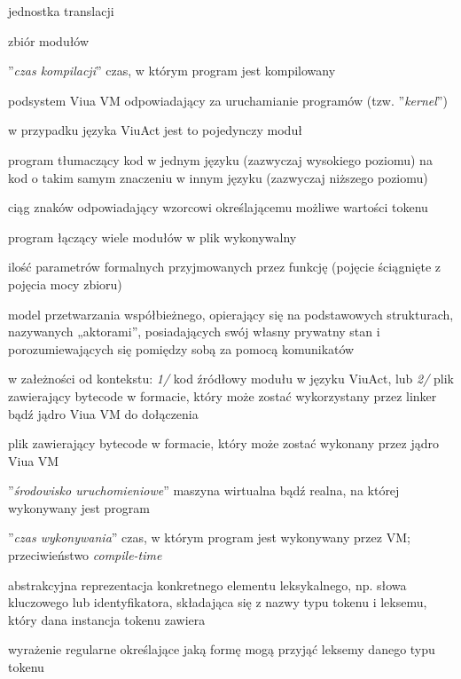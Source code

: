 \begin{labeling}{jednostka translacji}
    \item[biblioteka] zbiór modułów
    \item[\emph{compile-time}] ''\emph{czas kompilacji}'' czas, w którym program jest kompilowany
    \item[jądro] podsystem Viua VM odpowiadający za uruchamianie programów (tzw. ''\emph{kernel}'')
    \item[jednostka translacji] w przypadku języka ViuAct jest to pojedynczy moduł
    \item[kompilator] program tłumaczący kod w jednym języku (zazwyczaj wysokiego poziomu) na kod o takim
        samym znaczeniu w innym języku (zazwyczaj niższego poziomu)
    \item[leksem] ciąg znaków odpowiadający wzorcowi określającemu możliwe wartości tokenu
    \item[linker] program łączący wiele modułów w plik wykonywalny
    \item[moc funkcji] ilość parametrów formalnych przyjmowanych przez funkcję (pojęcie ściągnięte z pojęcia
        mocy zbioru)
    \item [model aktorów] model przetwarzania współbieżnego, opierający się na
        podstawowych strukturach, nazywanych „aktorami”, posiadających swój
        własny prywatny stan i porozumiewających się pomiędzy sobą za pomocą
        komunikatów
    \item[moduł] w załeżności od kontekstu: \emph{1/} kod źródłowy modułu w języku ViuAct, lub \emph{2/} plik
        zawierający bytecode w formacie, który może zostać wykorzystany przez linker bądź jądro Viua VM do
        dołączenia
    \item[plik wykonywalny] plik zawierający bytecode w formacie, który może zostać wykonany przez jądro Viua
        VM
    \item[runtime] ''\emph{środowisko uruchomieniowe}'' maszyna wirtualna bądź realna, na której
        wykonywany jest program
    \item[\emph{run-time}] ''\emph{czas wykonywania}'' czas, w którym program jest wykonywany przez VM;
        przeciwieństwo \emph{compile-time}
    \item[token] abstrakcyjna reprezentacja konkretnego elementu leksykalnego, np. słowa kluczowego lub
        identyfikatora, składająca się z nazwy typu tokenu i leksemu, który dana instancja tokenu zawiera
    \item[wzorzec] wyrażenie regularne określające jaką formę mogą przyjąć leksemy danego typu tokenu
\end{labeling}

